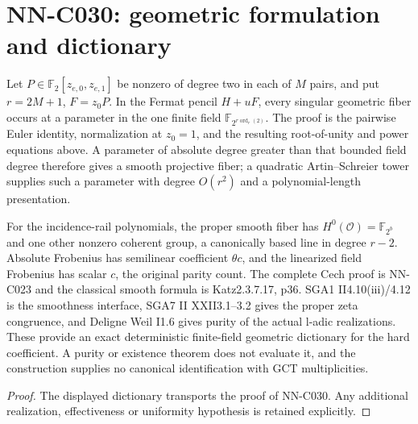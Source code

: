 \section{NN-C030: geometric formulation and dictionary}
\begin{geometricstatement}[NN-C030]
Let $P\in\mathbb F_2[z_{e,0},z_{e,1}]$ be nonzero of degree two in each of $M$ pairs, and put $r=2M+1$, $F=z_0P$. In the Fermat pencil $H+uF$, every singular geometric fiber occurs at a parameter in the one finite field $\mathbb F_{2^{r\operatorname{ord}_r(2)}}$. The proof is the pairwise Euler identity, normalization at $z_0=1$, and the resulting root-of-unity and power equations above. A parameter of absolute degree greater than that bounded field degree therefore gives a smooth projective fiber; a quadratic Artin--Schreier tower supplies such a parameter with degree $O(r^2)$ and a polynomial-length presentation.

For the incidence-rail polynomials, the proper smooth fiber has $H^0(\mathcal O)=\mathbb F_{2^b}$ and one other nonzero coherent group, a canonically based line in degree $r-2$. Absolute Frobenius has semilinear coefficient $\theta c$, and the linearized field Frobenius has scalar $c$, the original parity count. The complete Cech proof is NN-C023 and the classical smooth formula is Katz2.3.7.17, p36. SGA1 II4.10(iii)/4.12 is the smoothness interface, SGA7 II XXII3.1--3.2 gives the proper zeta congruence, and Deligne Weil I1.6 gives purity of the actual l-adic realizations. These provide an exact deterministic finite-field geometric dictionary for the hard coefficient. A purity or existence theorem does not evaluate it, and the construction supplies no canonical identification with GCT multiplicities.
\end{geometricstatement}
\begin{proof} The displayed dictionary transports the proof of NN-C030. Any additional realization, effectiveness or uniformity hypothesis is retained explicitly.\end{proof}


